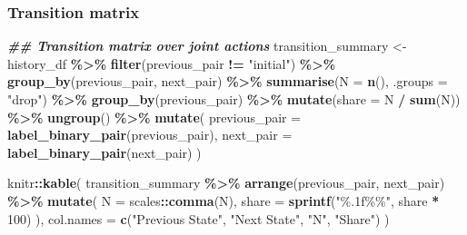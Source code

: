 \documentclass[
]{article}
\newenvironment{Shaded}{\begin{snugshade}}{\end{snugshade}}
\newcommand{\AttributeTok}[1]{\textcolor[rgb]{0.13,0.29,0.53}{#1}}
\newcommand{\DecValTok}[1]{\textcolor[rgb]{0.00,0.00,0.81}{#1}}
\newcommand{\DocumentationTok}[1]{\textcolor[rgb]{0.56,0.35,0.01}{\textbf{\textit{#1}}}}
\newcommand{\FunctionTok}[1]{\textcolor[rgb]{0.13,0.29,0.53}{\textbf{#1}}}
\newcommand{\NormalTok}[1]{#1}
\newcommand{\OtherTok}[1]{\textcolor[rgb]{0.56,0.35,0.01}{#1}}
\newcommand{\SpecialCharTok}[1]{\textcolor[rgb]{0.81,0.36,0.00}{\textbf{#1}}}
\newcommand{\StringTok}[1]{\textcolor[rgb]{0.31,0.60,0.02}{#1}}
\begin{document}
\subsubsection{Transition matrix}\label{transition-matrix}

\begin{Shaded}
\begin{Highlighting}[]
\DocumentationTok{\#\# Transition matrix over joint actions}
\NormalTok{transition\_summary }\OtherTok{\textless{}{-}}\NormalTok{ history\_df }\SpecialCharTok{\%\textgreater{}\%}
  \FunctionTok{filter}\NormalTok{(previous\_pair }\SpecialCharTok{!=} \StringTok{"initial"}\NormalTok{) }\SpecialCharTok{\%\textgreater{}\%}
  \FunctionTok{group\_by}\NormalTok{(previous\_pair, next\_pair) }\SpecialCharTok{\%\textgreater{}\%}
  \FunctionTok{summarise}\NormalTok{(}\AttributeTok{N =} \FunctionTok{n}\NormalTok{(), }\AttributeTok{.groups =} \StringTok{"drop"}\NormalTok{) }\SpecialCharTok{\%\textgreater{}\%}
  \FunctionTok{group\_by}\NormalTok{(previous\_pair) }\SpecialCharTok{\%\textgreater{}\%}
  \FunctionTok{mutate}\NormalTok{(}\AttributeTok{share =}\NormalTok{ N }\SpecialCharTok{/} \FunctionTok{sum}\NormalTok{(N)) }\SpecialCharTok{\%\textgreater{}\%}
  \FunctionTok{ungroup}\NormalTok{() }\SpecialCharTok{\%\textgreater{}\%}
  \FunctionTok{mutate}\NormalTok{(}
    \AttributeTok{previous\_pair =} \FunctionTok{label\_binary\_pair}\NormalTok{(previous\_pair),}
    \AttributeTok{next\_pair     =} \FunctionTok{label\_binary\_pair}\NormalTok{(next\_pair)}
\NormalTok{  )}

\NormalTok{knitr}\SpecialCharTok{::}\FunctionTok{kable}\NormalTok{(}
\NormalTok{  transition\_summary }\SpecialCharTok{\%\textgreater{}\%}
    \FunctionTok{arrange}\NormalTok{(previous\_pair, next\_pair) }\SpecialCharTok{\%\textgreater{}\%}
    \FunctionTok{mutate}\NormalTok{(}
      \AttributeTok{N =}\NormalTok{ scales}\SpecialCharTok{::}\FunctionTok{comma}\NormalTok{(N),}
      \AttributeTok{share =} \FunctionTok{sprintf}\NormalTok{(}\StringTok{"\%.1f\%\%"}\NormalTok{, share }\SpecialCharTok{*} \DecValTok{100}\NormalTok{)}
\NormalTok{    ),}
  \AttributeTok{col.names =} \FunctionTok{c}\NormalTok{(}\StringTok{"Previous State"}\NormalTok{, }\StringTok{"Next State"}\NormalTok{, }\StringTok{"N"}\NormalTok{, }\StringTok{"Share"}\NormalTok{)}
\NormalTok{)}
\end{Highlighting}
\end{Shaded}
\end{document}
